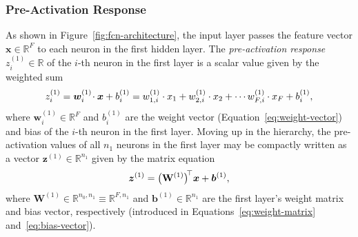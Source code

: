 \documentclass[11pt, a4paper]{article}
\renewcommand{\vec}[1]{\bm{#1}}
\newcommand{\mat}[1]{\mathbf{#1}}
\newcommand{\W}{\mat{W}}
\newcommand{\x}{\vec{x}}
\newcommand{\w}{\vec{w}}
\renewcommand{\b}{\vec{b}}
\newcommand{\z}{\vec{z}}
\begin{document}
\subsubsection{Pre-Activation Response}
As shown in Figure~\ref{fig:fcn-architecture}, the input layer passes the feature vector $ \x \in \mathbb{R}^{F} $ to each neuron in the first hidden layer.
The \textit{pre-activation response} $ z_{i}^{(1)} \in \mathbb{R} $ of the $ i $-th neuron in the first layer is a scalar value given by the weighted sum
\begin{equation*}
    z_{i}^{(1)} = \w_{i}^{(1)} \mspace{-3mu} \cdot \x + b_{i}^{(1)}= w_{1, i}^{(1)} \cdot x_{1} + w_{2, i}^{(1)} \cdot x_{2} + \cdots w_{F, i}^{(1)} \cdot x_{F} + b_{i}^{(1)},
\end{equation*}
where $ \w_{i}^{(1)} \in \mathbb{R}^{F} $ and $ b_{i}^{(1)} $ are the weight vector (Equation~\ref{eq:weight-vector}) and bias of the $ i $-th neuron in the first layer.
Moving up in the hierarchy, the pre-activation values of all $ n_{1} $ neurons in the first layer may be compactly written as a vector $ \z^{(1)} \in \mathbb{R}^{n_{1}} $ given by the matrix equation
\begin{equation*}
    \z^{(1)} = \big( \W^{(1)} \big)^{\mspace{-4mu}\top}\x + \b^{(1)},
\end{equation*}
where $ \W^{(1)} \in \mathbb{R}^{n_{0}, n_{1}} \equiv \mathbb{R}^{F, n_{1}} $ and $ \b^{(1)} \in \mathbb{R}^{n_{1}} $ are the first layer's weight matrix and bias vector, respectively (introduced in Equations~\ref{eq:weight-matrix} and~\ref{eq:bias-vector}).
\end{document}
